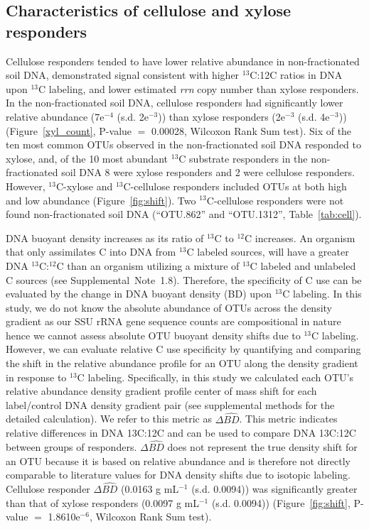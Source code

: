 \subsection{Characteristics of cellulose and xylose responders}
Cellulose responders tended to have lower relative abundance in
non-fractionated soil DNA, demonstrated signal consistent with higher
$^{13}$C:12C ratios in DNA upon $^{13}$C labeling, and lower estimated
\textit{rrn} copy number than xylose responders. In the non-fractionated soil
DNA, cellulose responders had significantly lower relative abundance (7e$^{-4}$
(s.d. 2e$^{-3}$)) than xylose responders (2e$^{-3}$ (s.d. 4e$^{-3}$))
(Figure~\ref{xyl_count}, P-value $=$ 0.00028, Wilcoxon Rank Sum test). Six of
the ten most common OTUs observed in the non-fractionated soil DNA responded to
xylose, and, of the 10 most abundant $^{13}$C substrate responders in the
non-fractionated soil DNA 8 were xylose responders and 2 were cellulose
responders. However, $^{13}$C-xylose and $^{13}$C-cellulose responders included
OTUs at both high and low abundance (Figure~\ref{fig:shift}). Two
$^{13}$C-cellulose responders were not found non-fractionated soil DNA
(``OTU.862'' and ``OTU.1312'', Table~\ref{tab:cell}).

DNA buoyant density increases as its ratio of $^{13}$C to $^{12}$C increases.
An organism that only assimilates C into DNA from $^{13}$C labeled sources,
will have a greater DNA $^{13}$C:$^{12}$C than an organism utilizing a mixture
of $^{13}$C labeled and unlabeled C sources (see Supplemental~Note~1.8).
Therefore, the specificity of C use can be evaluated by the change in DNA
buoyant density (BD) upon $^{13}$C labeling. In this study, we do not know the
absolute abundance of OTUs across the density gradient as our SSU rRNA gene
sequence counts are compositional in nature hence we cannot assess absolute OTU
buoyant density shifts due to $^{13}$C labeling. However, we can evaluate
relative C use specificity by quantifying and comparing the shift in the
relative abundance profile for an OTU along the density gradient in response to
$^{13}$C labeling. Specifically, in this study we calculated each OTU's
relative abundance density gradient profile center of mass shift for each
label/control DNA density gradient pair (see supplemental methods for the
detailed calculation). We refer to this metric as $\Delta\hat{BD}$. This metric
indicates relative differences in DNA 13C:12C and can be used to compare DNA
13C:12C between groups of responders. $\Delta\hat{BD}$ does not represent the
true density shift for an OTU because it is based on relative abundance and is
therefore not directly comparable to literature values for DNA density shifts
due to isotopic labeling. Cellulose responder $\Delta\hat{BD}$ (0.0163
g mL$^{-1}$ (s.d. 0.0094)) was significantly greater than that of xylose
responders (0.0097 g mL$^{-1}$ (s.d. 0.0094)) (Figure~\ref{fig:shift}, P-value
$=$ 1.8610e$^{-6}$, Wilcoxon Rank Sum test). 

